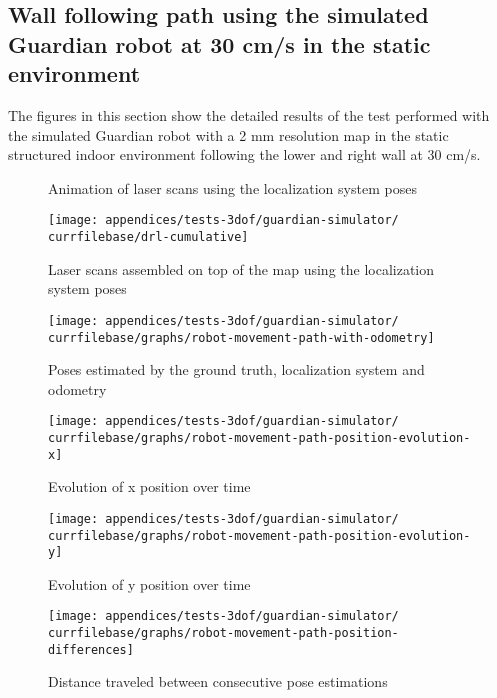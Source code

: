 \subsection{Wall following path using the simulated Guardian robot at 30 cm/s in the static environment}\label{subsec:appendix-a_guardian-simulator-tests_wall-following-path-using-the-simulated-guardian-robot-at-30-cm-s-in-static-environment}

The figures in this section show the detailed results of the test performed with the simulated Guardian robot with a 2 mm resolution map in the static structured indoor environment following the lower and right wall at 30 cm/s.


\begin{figure}[H]
	\centering
	\caption{Animation of laser scans using the localization system poses}
\end{figure}


\begin{figure}[H]
	\centering
	\texttt{[image: appendices/tests-3dof/guardian-simulator/\\currfilebase/drl-cumulative]}
	\caption{Laser scans assembled on top of the map using the localization system poses}
\end{figure}


\begin{figure}[H]
	\centering
	\texttt{[image: appendices/tests-3dof/guardian-simulator/\\currfilebase/graphs/robot-movement-path-with-odometry]}
	\caption{Poses estimated by the ground truth, localization system and odometry}
\end{figure}

\begin{figure}[H]
	\centering
	\texttt{[image: appendices/tests-3dof/guardian-simulator/\\currfilebase/graphs/robot-movement-path-position-evolution-x]}
	\caption{Evolution of x position over time}
\end{figure}

\begin{figure}[H]
	\centering
	\texttt{[image: appendices/tests-3dof/guardian-simulator/\\currfilebase/graphs/robot-movement-path-position-evolution-y]}
	\caption{Evolution of y position over time}
\end{figure}


\begin{figure}[H]
	\centering
	\texttt{[image: appendices/tests-3dof/guardian-simulator/\\currfilebase/graphs/robot-movement-path-position-differences]}
	\caption{Distance traveled between consecutive pose estimations}
\end{figure}

